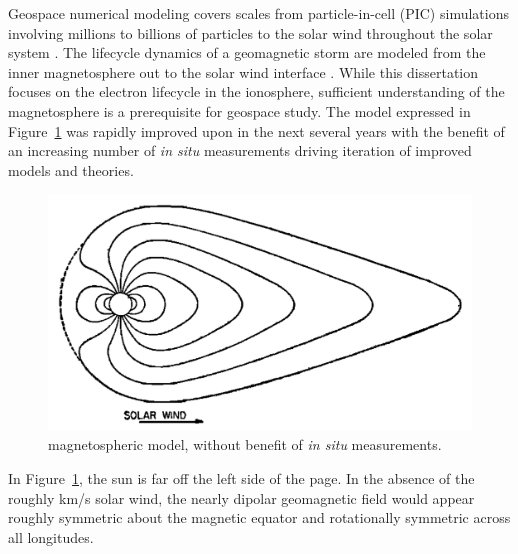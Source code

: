 Geospace numerical modeling covers scales from particle-in-cell (PIC) simulations involving millions to billions of particles \citep{young2016} to the solar wind throughout the solar system \citep{echim2011}.
The lifecycle dynamics of a geomagnetic storm are modeled from the inner magnetosphere \citep{tsyganenko2005} out to the solar wind interface \citep{tsyganenko1996}.
While this dissertation focuses on the electron lifecycle in the ionosphere, sufficient understanding of the magnetosphere is a prerequisite for geospace study.
The \citet{johnson1960} model expressed in Figure~\ref{fig:1960mag} was rapidly improved upon in the next several years \citep{mead1964} with the benefit of an increasing number of \textit{in situ} measurements driving iteration of improved models and theories.
\begin{figure}
	\includegraphics[width=\linewidth]{gfx/1960mag}
	\caption{\citet{johnson1960} magnetospheric model, without benefit of \textit{in situ} measurements.}\label{fig:1960mag}
\end{figure}
In Figure~\ref{fig:1960mag}, the sun is far off the left side of the page.
In the absence of the roughly \unit[400]{km/s} solar wind, the nearly dipolar geomagnetic field would appear roughly symmetric about the magnetic equator and rotationally symmetric across all longitudes.

